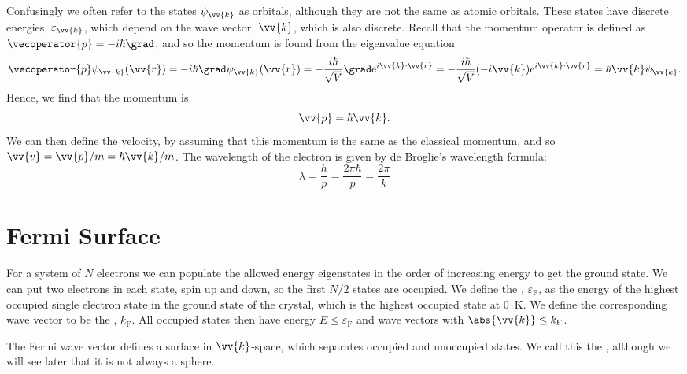 \documentclass[fleqn]{NotesClass}
\newcommand*{\e}{\mathrm{e}}
\newcommand*{\fermi}{\mathrm{F}}
\begin{document}
    Confusingly we often refer to the states \(\psi_{\vv{k}}\) as orbitals, although they are not the same as atomic orbitals.
    These states have discrete energies, \(\varepsilon_{\vv{k}}\), which depend on the wave vector, \(\vv{k}\), which is also discrete.
    Recall that the momentum operator is defined as \(\vecoperator{p} = -i\hbar\grad\), and so the momentum is found from the eigenvalue equation
    \begin{equation}
        \vecoperator{p}\psi_{\vv{k}}(\vv{r}) = -i\hbar\grad\psi_{\vv{k}}(\vv{r}) = -\frac{i\hbar}{\sqrt{V}}\grad\e^{i\vv{k}\cdot\vv{r}} = -\frac{i\hbar}{\sqrt{V}}(-i\vv{k})\e^{i\vv{k}\cdot\vv{r}} = \hbar\vv{k}\psi_{\vv{k}}.
    \end{equation}
    Hence, we find that the momentum is
    \begin{equation}
        \vv{p} = \hbar\vv{k}.
    \end{equation}
    We can then define the velocity, by assuming that this momentum is the same as the classical momentum, and so \(\vv{v} = \vv{p}/m = \hbar\vv{k}/m\).
    The wavelength of the electron is given by de Broglie's wavelength formula:
    \begin{equation}
        \lambda = \frac{h}{p} = \frac{2\pi\hbar}{p} = \frac{2\pi}{k}
    \end{equation}
    
    \section{Fermi Surface}
    For a system of \(N\) electrons we can populate the allowed energy eigenstates in the order of increasing energy to get the ground state.
    We can put two electrons in each state, spin up and down, so the first \(N/2\) states are occupied.
    We define the , \(\varepsilon_{\fermi}\), as the energy of the highest occupied single electron state in the ground state of the crystal, which is the highest occupied state at \qty{0}{\kelvin}.
    We define the corresponding wave vector to be the , \(k_{\fermi}\).
    All occupied states then have energy \(E \le \varepsilon_{\fermi}\) and wave vectors with \(\abs{\vv{k}} \le k_{\fermi}\).
    
    The Fermi wave vector defines a surface in \(\vv{k}\)-space, which separates occupied and unoccupied states.
    We call this the , although we will see later that it is not always a sphere.
    
\end{document}
